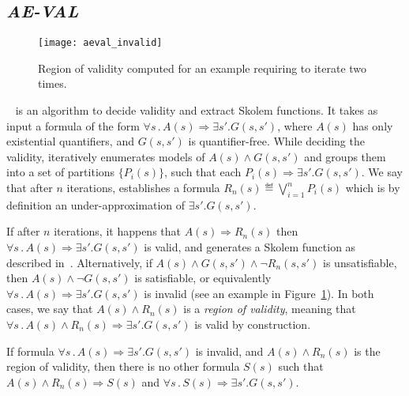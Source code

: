 \subsection{\textit{AE-VAL}}
\label{sec:aeval}

\begin{figure}[!t]
\centering
\texttt{[image: aeval\_invalid]}
\caption{Region of validity computed for an example requiring \aeval to iterate two times.}
\label{fg:aeval}
\end{figure}

\aeval~\cite{fedyukovich2015automated} is an algorithm to decide validity and extract Skolem functions.
It takes as input a formula of the form $\forall s \,.\,  A(s) \Rightarrow \exists s' . G(s,s')$, 
where $A(s)$ has only existential quantifiers, and $G(s,s')$ is quantifier-free.
%
While deciding the validity, \aeval iteratively enumerates models of $A(s) \land G (s, s')$ and groups them into a set of partitions $\{P_i(s)\}$, such that each $P_i(s) \Rightarrow \exists s' . G (s, s')$.
We say that after $n$ iterations, \aeval establishes a formula $R_n(s) \eqdef \bigvee_{i=1}^n P_i(s)$ which is by definition an under-approximation of $\exists s' . G (s, s')$.

If after $n$ iterations, it happens that $A(s) \Rightarrow R_n(s)$ then $\forall s \,.\,  A(s) \Rightarrow \exists s' . G(s,s')$ is valid, and \aeval generates a Skolem function as described in~\cite{katis2016synthesis}.
Alternatively, if $A(s) \land  G (s, s') \land \neg{R_n (s, s')}$ is unsatisfiable, then $A(s) \land \neg G (s, s')$ is satisfiable, or equivalently $\forall s \,.\,  A(s) \Rightarrow \exists s' . G(s,s')$ is invalid (see an example in Figure~\ref{fg:aeval}).
In both cases, we say that $A(s) \land R_n(s)$ is a \emph{region of validity}, meaning that $\forall s \,.\,  A(s) \land R_n(s) \Rightarrow \exists s' . G(s,s')$ is valid by construction.

\begin{lemma}
If formula $\forall s \,.\,  A(s) \Rightarrow \exists s' . G(s,s')$ is invalid, and $A(s) \land R_n(s)$ is the region of validity, then there is no other formula $S(s)$ such that $A(s) \land R_n(s) \Rightarrow S(s)$ and $\forall s \,.\,  S(s) \Rightarrow \exists s' . G(s,s')$.

\label{lem:subset}
\end{lemma}
